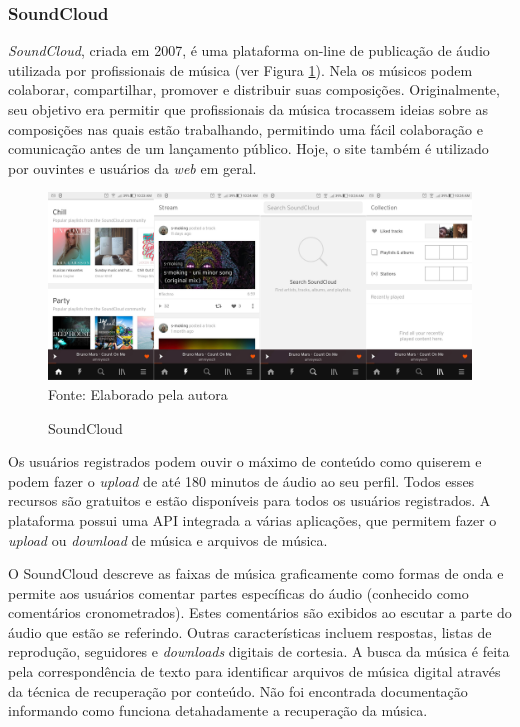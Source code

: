 \subsubsection{SoundCloud} \label{subsec:soundcloud}
\textit{SoundCloud}, criada em 2007, é uma plataforma on-line de publicação de áudio utilizada por profissionais de música (ver Figura \ref{fig:soundcloud}). Nela os músicos podem colaborar, compartilhar, promover e distribuir suas composições.
Originalmente, seu objetivo era permitir que profissionais da música trocassem ideias sobre as composições nas quais estão trabalhando, permitindo uma fácil colaboração e comunicação antes de um lançamento público. Hoje, o site também é utilizado por ouvintes e usuários da \textit{web} em geral.

\begin{figure}[!htb]
   \centering
   \caption{SoundCloud}\label{fig:soundcloud} 
   \includegraphics[scale=0.1]{figuras/soundcloud.jpg}
   \\Fonte: Elaborado pela autora
\end{figure}

Os usuários registrados podem ouvir o máximo de conteúdo como quiserem e podem fazer o \textit{upload} de até 180 minutos de áudio ao seu perfil. Todos esses recursos são gratuitos e estão disponíveis para todos os usuários registrados. A plataforma possui uma API integrada a várias aplicações, que permitem fazer o \textit{upload} ou \textit{download} de música e arquivos de música.

O SoundCloud descreve as faixas de música graficamente como formas de onda e permite aos usuários comentar partes específicas do áudio (conhecido como comentários cronometrados). Estes comentários são exibidos ao escutar a parte do áudio que estão se referindo. Outras características incluem respostas, listas de reprodução, seguidores e \textit{downloads} digitais de cortesia. A busca da música é feita pela correspondência de texto para identificar arquivos de música digital através da técnica de recuperação por conteúdo. Não foi encontrada documentação informando como funciona detahadamente a recuperação da música.

